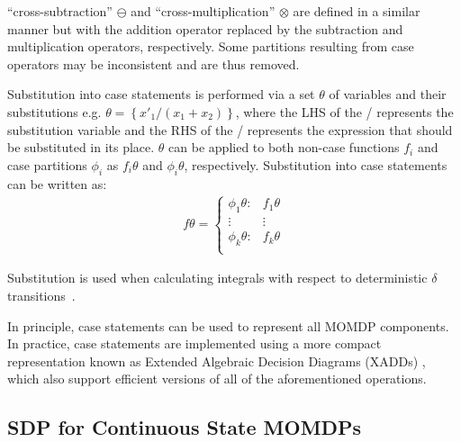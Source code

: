 \noindent ``cross-subtraction'' $\ominus$ and ``cross-multiplication'' $\otimes$ are defined in a similar manner but with the addition operator replaced by the subtraction and multiplication operators, respectively. Some partitions resulting from case operators may be inconsistent and are thus removed.

Substitution into case statements is performed via a set $\theta$ of variables and their substitutions e.g. $\theta = \left\{ x'_1/(x_1 + x_2) \right\}$, where the LHS of the / represents the substitution variable and the RHS of the / represents the expression that should be substituted in its place. $\theta$ can be applied to both non-case functions $f_i$ and case partitions $\phi_i$ as $f_i\theta$ and $\phi_i\theta$, respectively. Substitution into case statements can be written as:
{\footnotesize 
    \abovedisplayskip=5pt
    \belowdisplayskip=0pt
    \begin{align*}
        f\theta = 
        \begin{cases}
            \phi_1\theta: & f_1\theta \\ 
            \vdots & \vdots\\ 
            \phi_k\theta: & f_k\theta \\ 
        \end{cases}
    \end{align*}
}%

Substitution is used when calculating integrals with respect to deterministic $\delta$ transitions~\parencite{Sanner_UAI_2011}.

In principle, case statements can be used to represent all MOMDP components. In practice, case statements are implemented using a more compact representation known as Extended Algebraic Decision Diagrams (XADDs) \parencite{Sanner_UAI_2011}, which also support efficient versions of all of the aforementioned operations.

\subsection{SDP for Continuous State MOMDPs}
